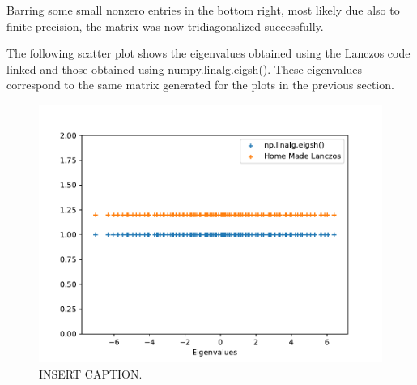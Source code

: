 Barring some small nonzero entries in the bottom right, most likely due also to finite precision, the matrix was now tridiagonalized successfully.

The following scatter plot shows the eigenvalues obtained using the Lanczos code linked and those obtained using numpy.linalg.eigsh(). These eigenvalues correspond to the same matrix generated for the plots in the previous section.

\begin{figure}[t]
\begin{center}
\includegraphics[width=0.7\columnwidth]{Images/Lanczos/eigenvaluesComparison.pdf}
\end{center}
\caption{INSERT CAPTION.}
\label{fig:particle_partition}
\end{figure}